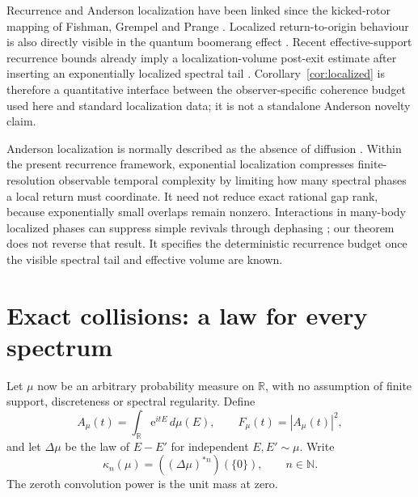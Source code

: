 \documentclass[10pt]{article}
\theoremstyle{definition}
\newcommand{\R}{\mathbb R}
\newcommand{\N}{\mathbb N}
\newcommand{\ee}{\mathrm e}
\begin{document}
Recurrence and Anderson localization have been linked since the kicked-rotor
mapping of Fishman, Grempel and Prange
\cite{FishmanGrempelPrange1982}. Localized return-to-origin behaviour is
also directly visible in the quantum boomerang effect
\cite{SajjadEtAl2022}. Recent effective-support recurrence bounds already
imply a localization-volume post-exit estimate after inserting an
exponentially localized spectral tail
\cite{KotowskiOszmaniec2026}. Corollary~\ref{cor:localized} is therefore a
quantitative interface between the observer-specific coherence budget used
here and standard localization data; it is not a standalone Anderson
novelty claim.

Anderson localization is normally described as the absence of diffusion
\cite{Anderson1958}. Within the present recurrence framework, exponential
localization compresses finite-resolution observable temporal complexity by
limiting how many spectral phases a local return must coordinate. It need
not reduce exact rational gap rank, because exponentially small overlaps
remain nonzero. Interactions in many-body localized phases can
suppress simple revivals through dephasing
\cite{VasseurParameswaranMoore2015}; our theorem does not reverse that
result. It specifies the deterministic recurrence budget once the visible
spectral tail and effective volume are known.

\section*{Exact collisions: a law for every spectrum}

Let \(\mu\) now be an arbitrary probability measure on \(\R\), with no
assumption of finite support, discreteness or spectral regularity. Define
\begin{equation}
 A_\mu(t)=\int_\R\ee^{itE}\,d\mu(E),\qquad
 F_\mu(t)=|A_\mu(t)|^2,
 \label{eq:general-fidelity}
\end{equation}
and let \(\Delta\mu\) be the law of \(E-E'\) for independent
\(E,E'\sim\mu\). Write
\begin{equation}
 \kappa_n(\mu)=((\Delta\mu)^{*n})(\{0\}),\qquad n\in\N.
 \label{eq:collision-mass}
\end{equation}
The zeroth convolution power is the unit mass at zero.
\end{document}
